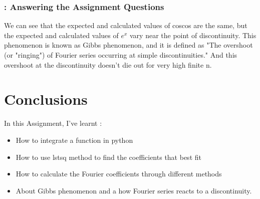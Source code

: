 \documentclass[11pt]{article}
\begin{document}
\subsubsection{: Answering the Assignment Questions}
We can see that the expected and calculated values of coscos are the same, but the expected and calculated values of $e^{x}$ vary near the point of discontinuity. This phenomenon is known as Gibbs phenomenon, and it is defined as "The overshoot (or "ringing") of Fourier series occurring at simple discontinuities." And this overshoot at the discontinuity doesn't die out for very high finite n.

\section{Conclusions}
In this Assignment, I've learnt :
\begin{itemize}
    \item How to integrate a function in python
    \item How to use lstsq method to find the coefficients that best fit
    \item How to calculate the Fourier coefficients through different methods
    \item About Gibbs phenomenon and a how Fourier series reacts to a discontinuity.
\end{itemize}
\end{document}

